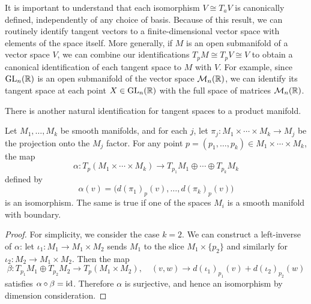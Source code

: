 It is important to understand that each isomorphism $V\cong T_aV$ is canonically defined, independently of any choice of basis. Because of this result, we can routinely identify tangent vectors to a finite-dimensional vector space with elements of the space itself. More generally, if $M$ is an open submanifold of a vector space $V$, we can combine our identifications $T_pM\cong T_pV\cong V$ to obtain a canonical identification of each tangent space to $M$ with $V$. For example, since $\mathrm{GL}_n(\mathbb{R})$ is an open submanifold of the vector space $\mathcal{M}_n(\mathbb{R})$, we can identify its tangent space at each point $X\in\mathrm{GL}_n(\mathbb{R})$ with the full space of matrices $\mathcal{M}_n(\mathbb{R})$.\par
There is another natural identification for tangent spaces to a product manifold.
\begin{proposition}
Let $M_1,\dots,M_k$ be smooth manifolds, and for each $j$, let $\pi_j:M_1\times\cdots\times M_k\to M_j$ be the projection onto the $M_j$ factor. For any point $p=(p_1,\dots,p_k)\in M_1\times\cdots\times M_k$, the map
\[\alpha:T_p(M_1\times\cdots\times M_k)\to T_{p_1}M_1\oplus\cdots\oplus T_{p_k}M_k\]
defined by
\[\alpha(v)=\big(d(\pi_1)_p(v),\dots,d(\pi_k)_p(v)\big)\]
is an isomorphism. The same is true if one of the spaces $M_i$ is a smooth manifold with boundary.
\end{proposition}
\begin{proof}
For simplicity, we consider the case $k=2$. We can construct a left-inverse of $\alpha$: let $\iota_1:M_1\to M_1\times M_2$ sends $M_1$ to the slice $M_1\times \{p_2\}$ and similarly for $\iota_2:M_2\to M_1\times M_2$. Then the map
\[\beta:T_{p_1}M_1\oplus T_{p_2}M_2\to T_p(M_1\times M_2),\quad(v,w)\to d(\iota_1)_{p_1}(v)+d(\iota_2)_{p_2}(w)\]
satisfies $\alpha\circ\beta=\mathrm{id}$. Therefore $\alpha$ is surjective, and hence an isomorphism by dimension consideration.
\end{proof}
